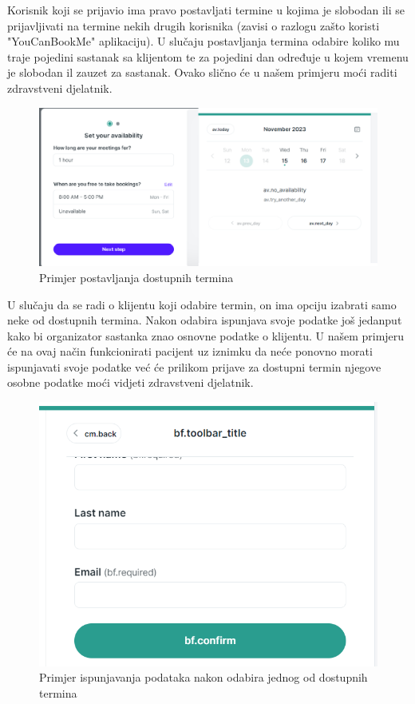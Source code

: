 		Korisnik koji se prijavio ima pravo postavljati termine u kojima je slobodan ili se prijavljivati na termine nekih drugih korisnika (zavisi o razlogu zašto koristi "YouCanBookMe" aplikaciju).	U slučaju postavljanja termina odabire koliko mu traje pojedini sastanak sa klijentom te za pojedini dan određuje u kojem vremenu je slobodan il zauzet za sastanak. Ovako slično će u našem primjeru moći raditi zdravstveni djelatnik.
		
		\begin{figure}[H]
			\includegraphics[scale=0.6]{slike/YouCanBookMe-Termin1.PNG} %
			\centering
			\caption{Primjer postavljanja dostupnih termina}
			\label{fig:promjene}
		\end{figure}
		
		U slučaju da se radi o klijentu koji odabire termin, on ima opciju izabrati samo neke od dostupnih termina. Nakon odabira ispunjava svoje podatke još jedanput kako bi organizator sastanka znao osnovne podatke o klijentu. U našem primjeru će na ovaj način funkcionirati pacijent uz iznimku da neće ponovno morati ispunjavati svoje podatke već će prilikom prijave za dostupni termin njegove osobne podatke moći vidjeti zdravstveni djelatnik. 
		
		\begin{figure}[H]
			\includegraphics[scale=0.6]{slike/YouCanBookMe-Termin3.PNG} %
			\centering
			\caption{Primjer ispunjavanja podataka nakon odabira jednog od dostupnih termina}
			\label{fig:promjene}
		\end{figure}
		

